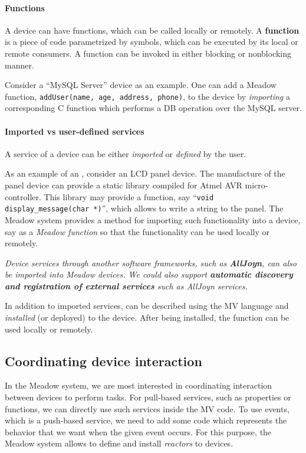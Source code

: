 \documentclass{note}
\begin{document}
\paragraph{Functions}
A device can have functions, which can be called locally or remotely.
A \textcolor{blue2}{\bf{}function} is a piece of code parametrized by
symbols, which can be executed by its local or remote consumers.
A function can be invoked in either blocking or nonblocking manner.

Consider a ``MySQL Server'' device as an example. One can add
a Meadow function, \textcolor{red2}{\texttt{addUser(name, age, address,
    phone)}}, to the device by \textcolor{blue2}{\em importing\/} a
corresponding C function which performs a DB operation over the MySQL server.


\paragraph{Imported vs user-defined services}
A service of a device can be either {\em imported\/}  or {\em defined\/} by
the user. 

As an example of an \textcolor{blue2}{}, consider an LCD
panel device. The manufacture of the panel device can provide a static library 
compiled for Atmel AVR micro-controller.
This library may provide a function, say
``\textcolor{red2}{\texttt{void display\_message(char *)}}'', which allows to 
write a string to the panel. The Meadow system provides a method for importing
such functionality into a device, say as a {\em Meadow function\/} so that 
the functionality can be used locally or remotely.

\textcolor{blue2}{\em Device services through another software frameworks,
  such as {\bf\em AllJoyn}, can also be imported into Meadow devices.
We could also support {\bf\em automatic discovery and registration of
external services\/} such as AllJoyn services.}


In addition to imported services, \textcolor{blue2}{} can be described using the {MV  language} and {\em
  installed\/} (or deployed) to the device. After being installed, the
function can be used locally or remotely.


\subsection{Coordinating device interaction}
In the Meadow system, we are most interested in coordinating interaction
between devices to perform tasks.
For pull-based services, such as properties or functions, we can 
directly use such services inside the MV code. To use events, which 
is a push-based service, we need to add some code which represents the
behavior that we want when the given event occurs.
For this purpose, the Meadow system allows to define and install {\em
  reactors\/} to devices.
\end{document}
